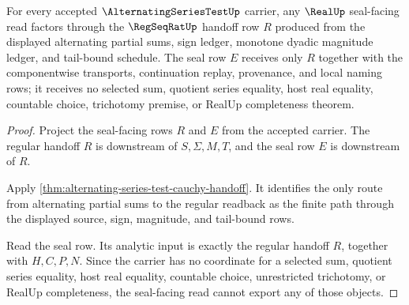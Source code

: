 \begin{theorem}
\label{thm:alternating-series-test-real-seal-boundary}
For every accepted $\AlternatingSeriesTestUp$ carrier, any $\RealUp$ seal-facing read factors through the $\RegSeqRatUp$ handoff row $R$ produced from the displayed alternating partial sums, sign ledger, monotone dyadic magnitude ledger, and tail-bound schedule. The seal row $E$ receives only $R$ together with the componentwise transports, continuation replay, provenance, and local naming rows; it receives no selected sum, quotient series equality, host real equality, countable choice, trichotomy premise, or RealUp completeness theorem.
\end{theorem}
\begin{proof}
Project the seal-facing rows $R$ and $E$ from the accepted carrier. The regular handoff $R$ is downstream of $S,\Sigma,M,T$, and the seal row $E$ is downstream of $R$.

Apply \autoref{thm:alternating-series-test-cauchy-handoff}. It identifies the only route from alternating partial sums to the regular readback as the finite path through the displayed source, sign, magnitude, and tail-bound rows.

Read the seal row. Its analytic input is exactly the regular handoff $R$, together with $H,C,P,N$. Since the carrier has no coordinate for a selected sum, quotient series equality, host real equality, countable choice, unrestricted trichotomy, or RealUp completeness, the seal-facing read cannot export any of those objects.
\end{proof}

